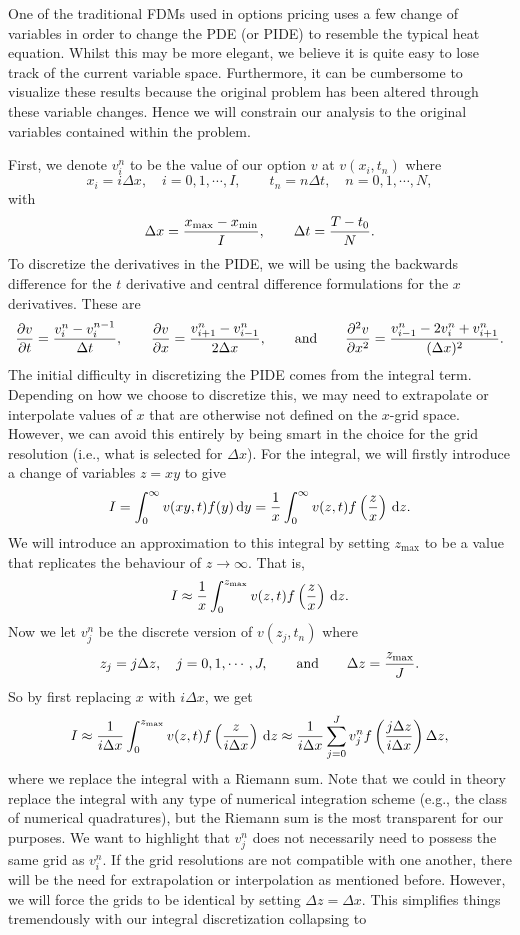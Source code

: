 One of the traditional FDMs used in options pricing uses a few change of variables in order to change the PDE (or PIDE) to resemble the typical heat equation. Whilst this may be more elegant, we believe it is quite easy to lose track of the current variable space. Furthermore, it can be cumbersome to visualize these results because the original problem has been altered through these variable changes. Hence we will constrain our analysis to the original variables contained within the problem.

First, we denote $v_i^n$ to be the value of our option $v$ at $v(x_i,t_n)$ where
	$$
		x_i = i\Delta x, \quad i = 0,1,\cdots,I,
		\qquad
		t_n = n\Delta t, \quad n = 0,1,\cdots,N,
	$$
with 
	$$
		\Delta x = \frac{x_{\text{max}}-x_{\text{min}}}{I}, \qquad \Delta t = \frac{T-t_0}{N}.
	$$
To discretize the derivatives in the PIDE, we will be using the backwards difference for the $t$ derivative and central difference formulations for the $x$ derivatives. These are
	$$
		\frac{\partial v}{\partial t} = \frac{v_i^n - v_i^{n-1}}{\Delta t},
		\qquad
		\frac{\partial v}{\partial x} = \frac{ v_{i+1}^n - v_{i-1}^n}{2\Delta x}, \qquad \text{and} \qquad
		\frac{\partial^2 v}{\partial x^2} = \frac{v_{i-1}^n - 2v_i^n + v_{i+1}^n}{(\Delta x)^2}.
	$$
The initial difficulty in discretizing the PIDE comes from the integral term. Depending on how we choose to discretize this, we may need to extrapolate or interpolate values of $x$ that are otherwise not defined on the $x$-grid space. However, we can avoid this entirely by being smart in the choice for the grid resolution (i.e., what is selected for $\Delta x$). For the integral, we will firstly introduce a change of variables $z = xy$ to give
	$$
		I = \int_0^\infty v(xy,t)f(y) \, \mathrm d y = \frac{1}{x}\int_0^\infty v(z,t)f\left(\frac{z}{x}\right) \, \mathrm d z.
	$$
We will introduce an approximation to this integral by setting $z_{\text{max}}$ to be a value that replicates the behaviour of $z \rightarrow \infty$. That is,
	$$
		I \approx  \frac{1}{x}\int_0^{z_\text{max}} v(z,t)f\left(\frac{z}{x}\right) \, \mathrm d z.
	$$
Now we let $v_j^n$ be the discrete version of $v(z_j,t_n)$ where
	$$
		z_j = j \Delta z, \quad j = 0,1,\cdots,J, \qquad \text{and} \qquad \Delta z = \frac{z_\text{max}}{J}.
	$$
So by first replacing $x$ with $i \Delta x$, we get
	$$
		I \approx  \frac{1}{i\Delta x}\int_0^{z_\text{max}} v(z,t)f\left(\frac{z}{i\Delta x}\right) \, \mathrm d z \approx  \frac{1}{i\Delta x}\sum\limits_{j=0}^J v_j^n f\left( \frac{j\Delta z}{i \Delta x} \right) \Delta z,
	$$
where we replace the integral with a Riemann sum. Note that we could in theory replace the integral with any type of numerical integration scheme (e.g., the class of numerical quadratures), but the Riemann sum is the most transparent for our purposes. We want to highlight that $v_j^n$ does not necessarily need to possess the same grid as $v_i^n$. If the grid resolutions are not compatible with one another, there will be the need for extrapolation or interpolation as mentioned before. However, we will force the grids to be identical by setting $\Delta z = \Delta x$. This simplifies things tremendously with our integral discretization collapsing to
